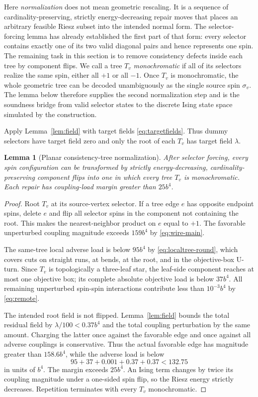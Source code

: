 \documentclass[12pt,a4paper]{article}
\newtheorem{lemma}[theorem]{Lemma}
\begin{document}
Here \emph{normalization} does not mean geometric rescaling.  It is a sequence of cardinality-preserving, strictly energy-decreasing repair moves that places an arbitrary feasible Riesz subset into the intended normal form.  The selector-forcing lemma has already established the first part of that form: every selector contains exactly one of its two valid diagonal pairs and hence represents one spin.  The remaining task in this section is to remove consistency defects inside each tree by component flips.  We call a tree $T_v$ \emph{monochromatic} if all of its selectors realize the same spin, either all $+1$ or all $-1$.  Once $T_v$ is monochromatic, the whole geometric tree can be decoded unambiguously as the single source spin $\sigma_v$.  The lemma below therefore supplies the second normalization step and is the soundness bridge from valid selector states to the discrete Ising state space simulated by the construction.

Apply Lemma~\ref{lem:field} with target fields \eqref{eq:targetfields}.  Thus dummy selectors have target field zero and only the root of each $T_v$ has target field $\lambda$.

\begin{lemma}[Planar consistency-tree normalization]\label{lem:normalize}
After selector forcing, every spin configuration can be transformed by strictly energy-decreasing, cardinality-preserving component flips into one in which every tree $T_v$ is monochromatic.  Each repair has coupling-load margin greater than $25b^4$.
\end{lemma}

\begin{proof}
Root $T_v$ at its source-vertex selector.  If a tree edge $e$ has opposite endpoint spins, delete $e$ and flip all selector spins in the component not containing the root.  This makes the nearest-neighbor product on $e$ equal to $+1$.  The favorable unperturbed coupling magnitude exceeds $159b^4$ by \eqref{eq:wire-main}.

The same-tree local adverse load is below $95b^4$ by \eqref{eq:localtree-round}, which covers cuts on straight runs, at bends, at the root, and in the objective-box U-turn.  Since $T_v$ is topologically a three-leaf star, the leaf-side component reaches at most one objective box; its complete absolute objective load is below $37b^4$.  All remaining unperturbed spin-spin interactions contribute less than $10^{-3}b^4$ by \eqref{eq:remote}.

The intended root field is not flipped.  Lemma~\ref{lem:field} bounds the total residual field by $\lambda/100<0.37b^4$ and the total coupling perturbation by the same amount.  Charging the latter once against the favorable edge and once against all adverse couplings is conservative.  Thus the actual favorable edge has magnitude greater than $158.6b^4$, while the adverse load is below
\[
 95+37+0.001+0.37+0.37<132.75
\]
in units of $b^4$.  The margin exceeds $25b^4$.  An Ising term changes by twice its coupling magnitude under a one-sided spin flip, so the Riesz energy strictly decreases.  Repetition terminates with every $T_v$ monochromatic.
\end{proof}
\end{document}

